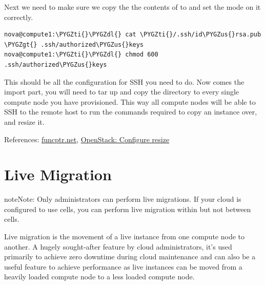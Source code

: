 \documentclass[letterpaper,10pt,english]{sphinxmanual}
\def\PYGZus{\char`\_}
\def\PYGZgt{\char`\>}
\def\PYGZdl{\char`\$}
\def\PYGZti{\char`\~}
\begin{document}
Next we need to make sure we copy the the contents of  to  and set the mode on it correctly.

\begin{Verbatim}[commandchars=\\\{\}]
nova@compute1:\PYGZti{}\PYGZdl{} cat \PYGZti{}/.ssh/id\PYGZus{}rsa.pub \PYGZgt{} .ssh/authorized\PYGZus{}keys
nova@compute1:\PYGZti{}\PYGZdl{} chmod 600 .ssh/authorized\PYGZus{}keys
\end{Verbatim}

This should be all the configuration for SSH you need to do. Now comes the import part, you will need to tar up and copy the  directory to every single compute node you have provisioned. This way all compute nodes will be able to SSH to the remote host to run the commands required to copy an instance over, and resize it.

References:
\href{http://funcptr.net/2014/09/29/openstack-resizing-of-instances/}{funcptr.net},
\href{http://docs.openstack.org/kilo/config-reference/content/configuring-resize.html}{OpenStack: Configure resize}


\section{Live Migration}
\label{_source/installation_guide/live_migration::doc}\label{_source/installation_guide/live_migration:live-migration}
\begin{notice}{note}{Note:}
Only administrators can perform live migrations. If your cloud is configured to use cells, you can perform live migration within but not between cells.
\end{notice}

Live migration is the movement of a live instance from one compute node to another. A hugely sought-after feature by cloud administrators, it’s used primarily to achieve zero downtime during cloud maintenance and can also be a useful feature to achieve performance as live instances can be moved from a heavily loaded compute node to a less loaded compute node.
\end{document}

